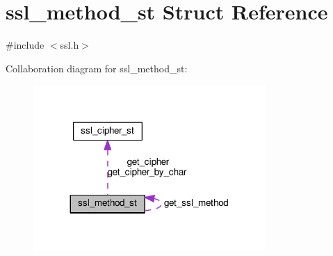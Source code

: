 \hypertarget{structssl__method__st}{}\section{ssl\+\_\+method\+\_\+st Struct Reference}
\label{structssl__method__st}


{\ttfamily \#include $<$ssl.\+h$>$}



Collaboration diagram for ssl\+\_\+method\+\_\+st\+:
\nopagebreak
\begin{figure}[H]
\begin{center}
\leavevmode
\includegraphics[width=251pt]{structssl__method__st__coll__graph}
\end{center}
\end{figure}
